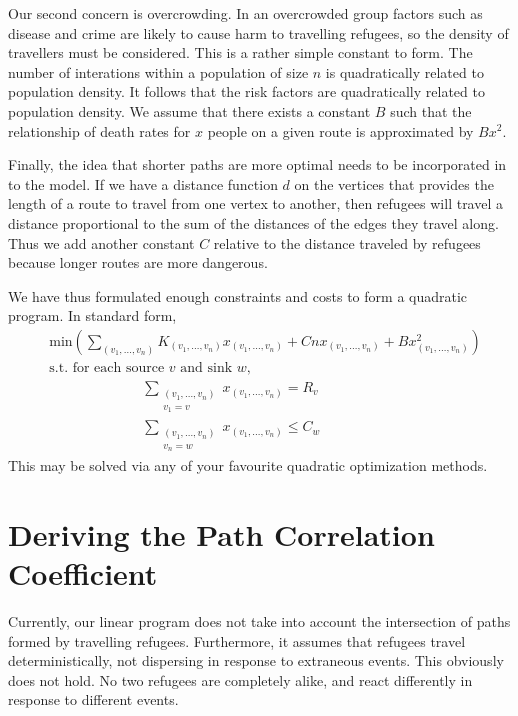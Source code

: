 \documentclass{article}
\begin{document}
Our second concern is overcrowding. In an overcrowded group factors such as disease and crime are likely to cause harm to travelling refugees, so the density of travellers must be considered. This is a rather simple constant to form. The number of interations within a population of size $n$ is quadratically related to population density. It follows that the risk factors are quadratically related to population density. We assume that there exists a constant $B$ such that the relationship of death rates for $x$ people on a given route is approximated by $Bx^2$. 

Finally, the idea that shorter paths are more optimal needs to be incorporated in to the model. If we have a distance function $d$ on the vertices that provides the length of a route to travel from one vertex to another, then refugees will travel a distance proportional to the sum of the distances of the edges they travel along. Thus we add another constant $C$ relative to the distance traveled by refugees because longer routes are more dangerous.

We have thus formulated enough constraints and costs to form a quadratic program.  In standard form,
%
\begin{align*}
    &\text{min} \left( \sum_{(v_1, \dots, v_n)} K_{(v_1, \dots, v_n)} x_{(v_1, \dots, v_n)} + Cn x_{(v_1, \dots, v_n)} + B x_{(v_1, \dots, v_n)}^2 \right)\\
    &\text{s.t. for each source $v$ and sink $w$,}\\
    &\ \ \ \ \ \ \ \ \ \ \ \ \ \ \ \ \ \ \ \ \ \ \ \ \ \ \ \ \ \ \sum_{\substack{(v_1, \dots, v_n) \\ v_1 = v}} x_{(v_1, \dots, v_n)} = R_v\\
    &\ \ \ \ \ \ \ \ \ \ \ \ \ \ \ \ \ \ \ \ \ \ \ \ \ \ \ \ \ \ \sum_{\substack{(v_1, \dots, v_n) \\ v_n = w}} x_{(v_1, \dots, v_n)} \leq C_w
\end{align*}
%
This may be solved via any of your favourite quadratic optimization methods.

\section{Deriving the Path Correlation Coefficient}

Currently, our linear program does not take into account the intersection of paths formed by travelling refugees. Furthermore, it assumes that refugees travel deterministically, not dispersing in response to extraneous events. This obviously does not hold. No two refugees are completely alike, and react differently in response to different events.
\end{document}
